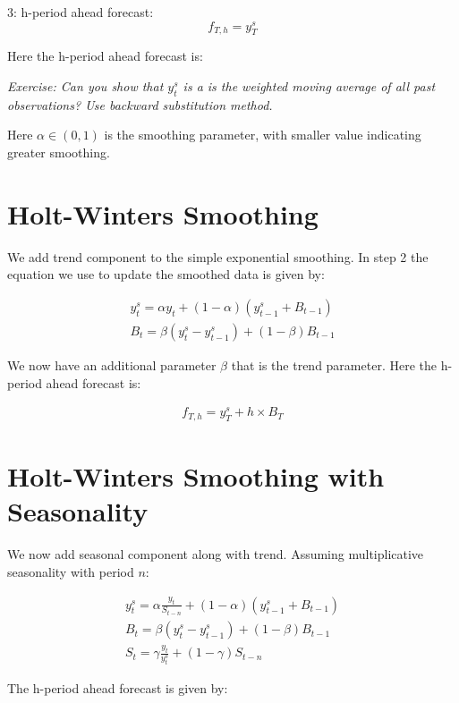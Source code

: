 \documentclass[]{book}
\theoremstyle{definition}
\theoremstyle{definition}
\theoremstyle{definition}
\theoremstyle{remark}
\begin{document}
3: h-period ahead forecast: \[f_{T,h}= y_T^s\]

Here the h-period ahead forecast is:

\emph{Exercise: Can you show that \(y_{t}^{s}\) is a is the weighted
moving average of all past observations? Use backward substitution
method.}

Here \(\alpha \in (0,1)\) is the smoothing parameter, with smaller value
indicating greater smoothing.

\hypertarget{holt-winters-smoothing}{%
\section{Holt-Winters Smoothing}\label{holt-winters-smoothing}}

We add trend component to the simple exponential smoothing. In step 2
the equation we use to update the smoothed data is given by:

\begin{align}
    y_{t}^{s}= \alpha y_t + (1-\alpha)(y_{t-1}^{s}+B_{t-1}) \\ \nonumber
    B_t = \beta (y_t^s -y_{t-1}^s) + (1-\beta) B_{t-1}
 \end{align}

We now have an additional parameter \(\beta\) that is the trend
parameter. Here the h-period ahead forecast is:

\begin{align}
  f_{T,h} = y_T^s + h\times B_T
  \end{align}

\hypertarget{holt-winters-smoothing-with-seasonality}{%
\section{Holt-Winters Smoothing with
Seasonality}\label{holt-winters-smoothing-with-seasonality}}

We now add seasonal component along with trend. Assuming multiplicative
seasonality with period \(n\):

\begin{align}
    y_{t}^{s}= \alpha \frac{y_t}{S_{t-n}} + (1-\alpha)(y_{t-1}^{s}+B_{t-1})\\
    B_t = \beta (y_t^s -y_{t-1}^s) + (1-\beta) B_{t-1}\\
    S_t = \gamma\frac{y_t}{y_t^s}+(1-\gamma)S_{t-n}
  \end{align}

The h-period ahead forecast is given by:
\end{document}
